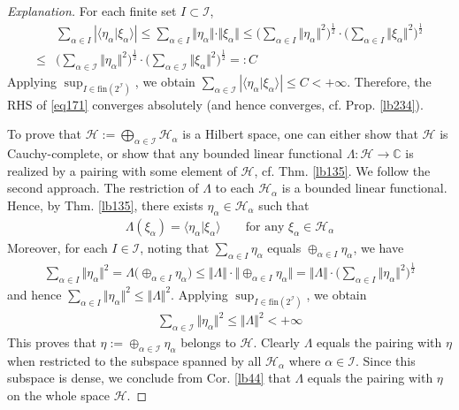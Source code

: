 \documentclass[12pt,b5paper,notitlepage]{article}
\theoremstyle{definition}
\theoremstyle{plain}
\newcommand{\bk}[1]{\langle {#1}\rangle}
\newcommand{\Cbb}{\mathbb C}
\newcommand{\fin}{\mathrm{fin}}
\newcommand{\MH}{\mathcal H}
\newcommand{\SI}{\mathscr I}
\numberwithin{equation}{section}
\begin{document}
\begin{proof}[Explanation]
For each finite set $I\subset\SI$, 
\begin{align*}
&\sum_{\alpha\in I}|\bk{\eta_\alpha|\xi_\alpha}|\leq\sum_{\alpha\in I}\Vert\eta_\alpha\Vert\cdot\Vert\xi_\alpha\Vert\leq\Big(\sum_{\alpha\in I}\Vert\eta_\alpha\Vert^2\Big)^{\frac 12}\cdot \Big(\sum_{\alpha\in I}\Vert\xi_\alpha\Vert^2\Big)^{\frac 12}\\
\leq&\Big(\sum_{\alpha\in\SI}\Vert\eta_\alpha\Vert^2\Big)^{\frac 12}\cdot \Big(\sum_{\alpha\in\SI}\Vert\xi_\alpha\Vert^2\Big)^{\frac 12}=:C
\end{align*}
Applying $\sup_{I\in\fin(2^\SI)}$, we obtain $\sum_{\alpha\in \SI}|\bk{\eta_\alpha|\xi_\alpha}|\leq C<+\infty$. Therefore, the RHS of \eqref{eq171} converges absolutely (and hence converges, cf. Prop. \ref{lb234}).

To prove that $\MH:=\bigoplus_{\alpha\in\SI}\MH_\alpha$ is a Hilbert space, one can either show that $\MH$ is Cauchy-complete, or show that any bounded linear functional $\Lambda:\MH\rightarrow\Cbb$ is realized by a pairing with some element of $\MH$, cf. Thm. \ref{lb135}. We follow the second approach. The restriction of $\Lambda$ to each $\MH_\alpha$ is a bounded linear functional. Hence, by Thm. \ref{lb135}, there exists $\eta_\alpha\in\MH_\alpha$ such that
\begin{align*}
\Lambda(\xi_\alpha)=\bk{\eta_\alpha|\xi_\alpha}\qquad\text{for any }\xi_\alpha\in\MH_\alpha
\end{align*} 
Moreover, for each $I\in\SI$, noting that $\sum_{\alpha\in I}\eta_\alpha$ equals $\oplus_{\alpha\in I}\eta_\alpha$, we have
\begin{align*}
\sum_{\alpha\in I}\Vert\eta_\alpha\Vert^2=\Lambda\big(\oplus_{\alpha\in I}\eta_\alpha\big)\leq\Vert\Lambda\Vert\cdot \big\Vert\oplus_{\alpha\in I}\eta_\alpha\big\Vert=\Vert\Lambda\Vert\cdot \Big(\sum_{\alpha\in I}\Vert\eta_\alpha\Vert^2\Big)^{\frac 12}
\end{align*}
and hence $\sum_{\alpha\in I}\Vert\eta_\alpha\Vert^2\leq\Vert\Lambda\Vert^2$. Applying $\sup_{I\in\fin(2^\SI)}$, we obtain
\begin{align*}
\sum_{\alpha\in\SI}\Vert\eta_\alpha\Vert^2\leq\Vert\Lambda\Vert^2<+\infty
\end{align*}
This proves that $\eta:=\oplus_{\alpha\in\SI}\eta_\alpha$ belongs to $\MH$. Clearly $\Lambda$ equals the pairing with $\eta$ when restricted to the subspace spanned by all $\MH_\alpha$ where $\alpha\in\SI$. Since this subspace is dense, we conclude from Cor. \ref{lb44} that $\Lambda$ equals the pairing with $\eta$ on the whole space $\MH$.
\end{proof}
\end{document}
